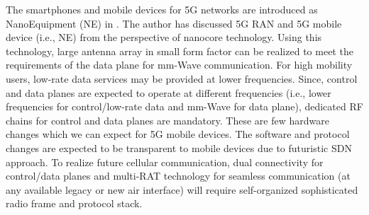 \documentclass[article,10pt,twocolumn]{IEEEtran}
\begin{document}
The smartphones and mobile devices for 5G networks are introduced as NanoEquipment (NE) in \citep{Nanocore}. The author has discussed 5G RAN and 5G mobile device (i.e., NE) from the perspective of nanocore technology. Using this technology, large antenna array in small form factor can be realized to meet the requirements of the data plane for mm-Wave communication. For high mobility users, low-rate data services may be provided at lower frequencies. Since, control and data planes are expected to operate at different frequencies (i.e., lower frequencies for control/low-rate data and mm-Wave for data plane), dedicated RF chains for control and data planes are mandatory. These are few hardware changes which we can expect for 5G mobile devices. The software and protocol changes are expected to be transparent to mobile devices due to futuristic SDN approach. To realize future cellular communication, dual connectivity for control/data planes and multi-RAT technology for seamless communication (at any available legacy or new air interface) will require self-organized sophisticated radio frame and protocol stack.
\end{document}
